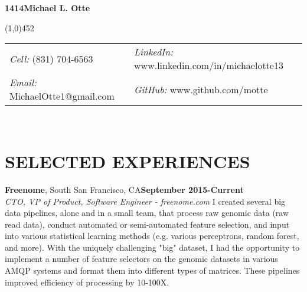 \documentclass[a4paper, 12pt]{article}
\makeatletter
\newcommand\header{\@setfontsize\Huge{14}{14}} %
\makeatother
\begin{document}
\noindent
\textbf{\header Michael L. Otte}
\vspace{-3mm}

\noindent
\line(1,0){452}\\[2mm]
\begin{tabular}{ |p{2.9in}|p{3.75in}| }
{\sl Cell:} (831) 704-6563 & {\sl LinkedIn:} www.linkedin.com/in/michaelotte13 \\[0mm]
{\sl Email:} MichaelOtte1@gmail.com & {\sl GitHub:} www.github.com/motte \\[3mm]
\end{tabular}\\[-5mm]

\section*{SELECTED EXPERIENCES}
\vspace{-3mm}

{\bf Freenome}{, South San Francisco, CA}\hfill {\bf September 2015-Current \\}
{\sl CTO, VP of Product, Software Engineer - freenome.com} \newline
\indent I created several big data pipelines, alone and in a small team, that process raw genomic data (raw read data), conduct automated or semi-automated feature selection, and input into various statistical learning methods (e.g. various perceptrons, random forest, and more).  With the uniquely challenging "big" dataset, I had the opportunity to implement a number of feature selectors on the genomic datasets in various AMQP systems and format them into different types of matrices.  These pipelines improved efficiency of processing by 10-100X.
\end{document}
